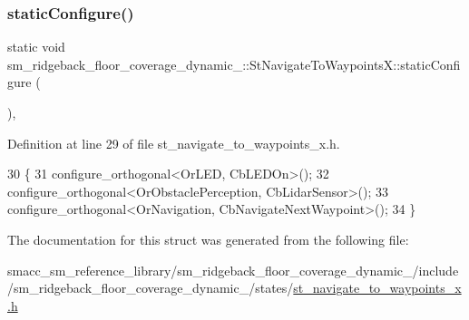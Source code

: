 \subsubsection{\texorpdfstring{static\+Configure()}{staticConfigure()}}
{\footnotesize\ttfamily static void sm\+\_\+ridgeback\+\_\+floor\+\_\+coverage\+\_\+dynamic\+\_\+::\+St\+Navigate\+To\+Waypoints\+X\+::static\+Configure (\begin{DoxyParamCaption}{ }\end{DoxyParamCaption})\hspace{0.3cm}{\ttfamily [inline]}, {\ttfamily [static]}}



Definition at line 29 of file st\+\_\+navigate\+\_\+to\+\_\+waypoints\+\_\+x.\+h.


\begin{DoxyCode}
30   \{
31     configure\_orthogonal<OrLED, CbLEDOn>();
32     configure\_orthogonal<OrObstaclePerception, CbLidarSensor>();
33     configure\_orthogonal<OrNavigation, CbNavigateNextWaypoint>();
34   \}
\end{DoxyCode}


The documentation for this struct was generated from the following file\+:\begin{DoxyCompactItemize}
\item 
smacc\+\_\+sm\+\_\+reference\+\_\+library/sm\+\_\+ridgeback\+\_\+floor\+\_\+coverage\+\_\+dynamic\+\_/include/sm\+\_\+ridgeback\+\_\+floor\+\_\+coverage\+\_\+dynamic\+\_/states/\hyperlink{sm__ridgeback__floor__coverage__dynamic__1_2include_2sm__ridgeback__floor__coverage__dynamic__1_3fed5e8ad7de3a7070c001932f8560e3}{st\+\_\+navigate\+\_\+to\+\_\+waypoints\+\_\+x.\+h}\end{DoxyCompactItemize}
